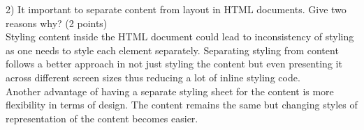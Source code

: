 \documentclass{WeSTassignment}
\begin{document}
2) It important to separate content from layout in HTML documents. Give two reasons why? (2 points)\\
Styling content inside the HTML document could lead to inconsistency of styling as one needs to style each element separately. Separating styling from content follows a better approach in not just styling the content but even presenting it across different screen sizes thus reducing a lot of inline styling code.\\
Another advantage of having a separate styling sheet for the content is more flexibility in terms of design. The content remains the same but changing styles of representation of the content becomes easier. 








\makefooter
\end{document}
